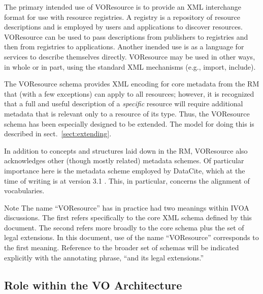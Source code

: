\documentclass[11pt,a4paper]{ivoa}
\begin{document}
The primary intended use of VOResource is to provide an XML interchange
format for use with resource registries.  A registry is a repository of
resource descriptions and is employed by users and applications to
discover resources.  VOResource can be used to pass descriptions from
publishers to registries and then from registries to applications.
Another inended use is as a language for services to describe themselves
directly.  VOResource may be used in other ways, in whole or in part,
using the standard XML mechanisms (e.g., import, include).  

The VOResource schema provides XML encoding for core
metadata from the RM that (with a few exceptions)
can apply to all resources; however, it is recognized that a full and
useful description of a \emph{specific} resource will require
additional metadata that is relevant only to a resource of its type.
Thus, the VOResource schema has been especially designed to be
extended.  The model for doing this is described in
sect.~\ref{sect:extending}.

In addition to concepts and structures laid down in the RM, VOResource
also acknowledges other (though mostly related) metadata schemes.  Of
particular importance here is the metadata scheme employed by DataCite,
which at the time of writing is at version 3.1 \citep{std:DataCite31}.
This, in particular, concerns the alignment of vocabularies.

\begin{admonition}{Note}
The name ``VOResource'' has in practice had two meanings within
IVOA discussions.  The first refers specifically to the core
XML schema defined by this document.  The second refers more
broadly to the core schema plus the set of legal extensions.
In this document, use of the name ``VOResource'' corresponds to
the first meaning.  Reference to the broader set of schemas
will be indicated explicitly with the annotating phrase, ``and
its legal extensions.''
\end{admonition}

\subsection{Role within the VO Architecture}
\end{document}
